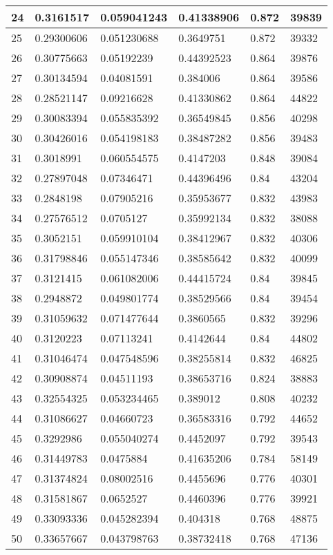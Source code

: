 \begin{longtable}{|l|l|l|l|l|l|}
24 & 0.3161517 & 0.059041243 & 0.41338906 & 0.872 & 39839 \\ \hline 
25 & 0.29300606 & 0.051230688 & 0.3649751 & 0.872 & 39332 \\ \hline 
26 & 0.30775663 & 0.05192239 & 0.44392523 & 0.864 & 39876 \\ \hline 
27 & 0.30134594 & 0.04081591 & 0.384006 & 0.864 & 39586 \\ \hline 
28 & 0.28521147 & 0.09216628 & 0.41330862 & 0.864 & 44822 \\ \hline 
29 & 0.30083394 & 0.055835392 & 0.36549845 & 0.856 & 40298 \\ \hline 
30 & 0.30426016 & 0.054198183 & 0.38487282 & 0.856 & 39483 \\ \hline 
31 & 0.3018991 & 0.060554575 & 0.4147203 & 0.848 & 39084 \\ \hline 
32 & 0.27897048 & 0.07346471 & 0.44396496 & 0.84 & 43204 \\ \hline 
33 & 0.2848198 & 0.07905216 & 0.35953677 & 0.832 & 43983 \\ \hline 
34 & 0.27576512 & 0.0705127 & 0.35992134 & 0.832 & 38088 \\ \hline 
35 & 0.3052151 & 0.059910104 & 0.38412967 & 0.832 & 40306 \\ \hline 
36 & 0.31798846 & 0.055147346 & 0.38585642 & 0.832 & 40099 \\ \hline 
37 & 0.3121415 & 0.061082006 & 0.44415724 & 0.84 & 39845 \\ \hline 
38 & 0.2948872 & 0.049801774 & 0.38529566 & 0.84 & 39454 \\ \hline 
39 & 0.31059632 & 0.071477644 & 0.3860565 & 0.832 & 39296 \\ \hline 
40 & 0.3120223 & 0.07113241 & 0.4142644 & 0.84 & 44802 \\ \hline 
41 & 0.31046474 & 0.047548596 & 0.38255814 & 0.832 & 46825 \\ \hline 
42 & 0.30908874 & 0.04511193 & 0.38653716 & 0.824 & 38883 \\ \hline 
43 & 0.32554325 & 0.053234465 & 0.389012 & 0.808 & 40232 \\ \hline 
44 & 0.31086627 & 0.04660723 & 0.36583316 & 0.792 & 44652 \\ \hline 
45 & 0.3292986 & 0.055040274 & 0.4452097 & 0.792 & 39543 \\ \hline 
46 & 0.31449783 & 0.0475884 & 0.41635206 & 0.784 & 58149 \\ \hline 
47 & 0.31374824 & 0.08002516 & 0.4455696 & 0.776 & 40301 \\ \hline 
48 & 0.31581867 & 0.0652527 & 0.4460396 & 0.776 & 39921 \\ \hline 
49 & 0.33093336 & 0.045282394 & 0.404318 & 0.768 & 48875 \\ \hline 
50 & 0.33657667 & 0.043798763 & 0.38732418 & 0.768 & 47136 \\ \hline 
\end{longtable}